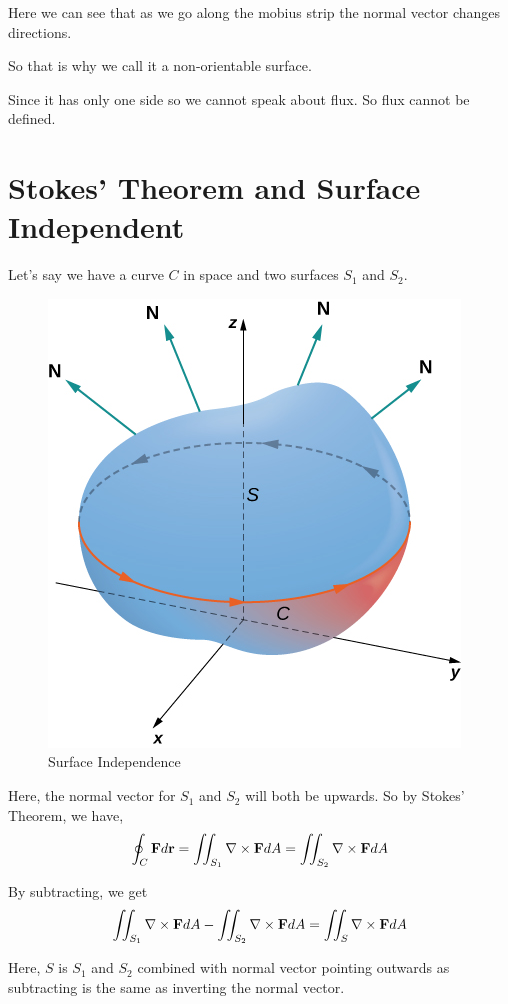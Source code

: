Here we can see that as we go along the mobius strip the normal vector changes directions.

So that is why we call it a non-orientable surface.

Since it has only one side so we cannot speak about flux.
So flux cannot be defined.

\section{Stokes' Theorem and Surface Independent}

Let's say we have a curve $C$ in space and two surfaces $S_1$ and $S_2$.

\begin{figure}[ht!]
    \centering
    \includegraphics[scale=0.7]{./images/lecture_28_figure_2.jpg}
    \caption{Surface Independence}
\end{figure}

Here, the normal vector for $S_1$ and $S_2$ will both be upwards.
So by Stokes' Theorem, we have,
$$ \oint_C {\bf F} d{\bf r} = \iint_{S_1} \nabla \times {\bf F} dA = \iint_{S_2} \nabla \times {\bf F} dA $$

By subtracting, we get 
$$ \iint_{S_1} \nabla \times {\bf F} dA - \iint_{S_2} \nabla \times {\bf F} dA = \iint_{S} \nabla \times {\bf F} dA $$

Here, $S$ is $S_1$ and $S_2$ combined with normal vector pointing outwards as subtracting is the same as inverting the normal vector.

